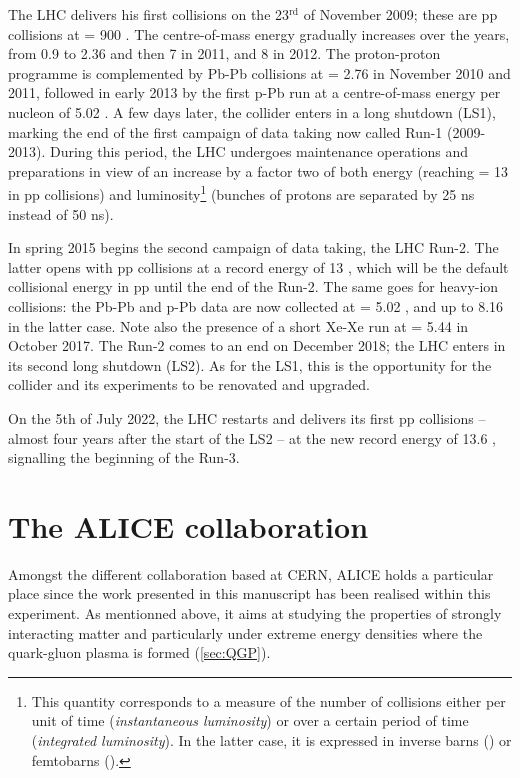 The LHC delivers his first collisions on the 23$^{\textrm{rd}}$ of November 2009; these are pp collisions at \sqrtS = 900 \gev. The centre-of-mass energy gradually increases over the years, from 0.9 \tev to 2.36 and then 7 \tev in 2011, and 8 \tev in 2012. The proton-proton programme is complemented by Pb-Pb collisions at \sqrtSnn = 2.76 \tev in November 2010 and 2011, followed in early 2013 by the first p-Pb run at a centre-of-mass energy per nucleon of 5.02 \tev. A few days later, the collider enters in a long shutdown (LS1), marking the end of the first campaign of data taking now called Run-1 (2009-2013). During this period, the LHC undergoes maintenance operations and preparations in view of an increase by a factor two of both energy (reaching \sqrtS = 13 \tev in pp collisions) and luminosity\footnote{This quantity corresponds to a measure of the number of collisions either per unit of time (\textit{instantaneous luminosity}) or over a certain period of time (\textit{integrated luminosity}). In the latter case, it is expressed in inverse barns (\invb) or femtobarns (\invfb).} (bunches of protons are separated by 25 ns instead of 50 ns).

In spring 2015 begins the second campaign of data taking, the LHC Run-2. The latter opens with pp collisions at a record energy of 13 \tev, which will be the default collisional energy in pp until the end of the Run-2. The same goes for heavy-ion collisions: the Pb-Pb and p-Pb data are now collected at \sqrtSnn = 5.02 \tev, and up to 8.16 \tev in the latter case. Note also the presence of a short Xe-Xe run at \sqrtSnn = 5.44 \tev in October 2017. The Run-2 comes to an end on December 2018; the LHC enters in its second long shutdown (LS2). As for the LS1, this is the opportunity for the collider and its experiments to be renovated and upgraded. 

On the 5th of July 2022, the LHC restarts and delivers its first pp collisions -- almost four years after the start of the LS2 -- at the new record energy of 13.6 \tev, signalling the beginning of the Run-3.

\section{The ALICE collaboration}
\label{sec:ALICECollaboration}

Amongst the different collaboration based at CERN, ALICE holds a particular place since the work presented in this manuscript has been realised within this experiment. As mentionned above, it aims at studying the properties of strongly interacting matter and particularly under extreme energy densities where the quark-gluon plasma is formed (\Sec\ref{sec:QGP}). 

